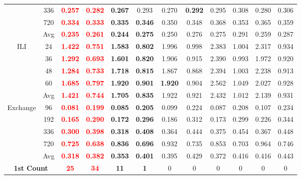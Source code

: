 \begin{table}[!htbp]
\begin{tabular}{c|c|cc|cc|cc|cc|cc}
& 336 & \textbf{\textcolor{red}{0.257}} & \textbf{\textcolor{red}{0.282}} & \textbf{0.267} & 0.293 & 0.270 & \textbf{0.292} & 0.295 & 0.308 & 0.280 & 0.306 \\
& 720 & \textbf{\textcolor{red}{0.334}} & \textbf{\textcolor{red}{0.333}} & \textbf{0.335} & \textbf{0.346} & 0.350 & 0.348 & 0.368 & 0.353 & 0.365 & 0.359 \\
& Avg & \textbf{\textcolor{red}{0.235}} & \textbf{\textcolor{red}{0.261}} & \textbf{0.244} & \textbf{0.275} & 0.250 & 0.276 & 0.275 & 0.291 & 0.259 & 0.287 \\
\midrule
\multirow{5}{*}{ILI}
& 24 & \textbf{\textcolor{red}{1.422}} & \textbf{\textcolor{red}{0.751}} & \textbf{1.583} & \textbf{0.802} & 1.996 & 0.998 & 2.383 & 1.004 & 2.317 & 0.934 \\
& 36 & \textbf{\textcolor{red}{1.292}} & \textbf{\textcolor{red}{0.693}} & \textbf{1.601} & \textbf{0.820} & 1.906 & 0.915 & 2.390 & 0.993 & 1.972 & 0.920 \\
& 48 & \textbf{\textcolor{red}{1.284}} & \textbf{\textcolor{red}{0.733}} & \textbf{1.718} & \textbf{0.815} & 1.867 & 0.868 & 2.394 & 1.003 & 2.238 & 0.913 \\
& 60 & \textbf{\textcolor{red}{1.685}} & \textbf{\textcolor{red}{0.797}} & \textbf{1.920} & \textbf{0.901} & \textbf{1.920} & 0.904 & 2.562 & 1.049 & 2.027 & 0.928 \\
& Avg & \textbf{\textcolor{red}{1.421}} & \textbf{\textcolor{red}{0.744}} & \textbf{1.705} & \textbf{0.835} & 1.922 & 0.921 & 2.432 & 1.012 & 2.139 & 0.931 \\
\midrule
\multirow{5}{*}{Exchange}
& 96 & \textbf{\textcolor{red}{0.081}} & \textbf{\textcolor{red}{0.199}} & \textbf{0.085} & \textbf{0.205} & 0.099 & 0.224 & 0.087 & 0.208 & 0.107 & 0.234 \\
& 192 & \textbf{\textcolor{red}{0.165}} & \textbf{\textcolor{red}{0.290}} & \textbf{0.172} & \textbf{0.296} & 0.186 & 0.312 & 0.173 & 0.299 & 0.226 & 0.344 \\
& 336 & \textbf{\textcolor{red}{0.300}} & \textbf{\textcolor{red}{0.398}} & \textbf{0.318} & \textbf{0.408} & 0.364 & 0.444 & 0.375 & 0.454 & 0.367 & 0.448 \\
& 720 & \textbf{\textcolor{red}{0.725}} & \textbf{\textcolor{red}{0.638}} & \textbf{0.836} & \textbf{0.696} & 0.932 & 0.735 & 0.853 & 0.703 & 0.964 & 0.746 \\
& Avg & \textbf{\textcolor{red}{0.318}} & \textbf{\textcolor{red}{0.382}} & \textbf{0.353} & \textbf{0.401} & 0.395 & 0.429 & 0.372 & 0.416 & 0.416 & 0.443 \\
\midrule
\multicolumn{2}{c|}{\textbf{1st Count}} & \textbf{\textcolor{red}{25}} & \textbf{\textcolor{red}{34}} & \textbf{11} & \textbf{1} & 0 & 0 & 0 & 0 & 0 & 0 \\
\bottomrule
\end{tabular}
\end{table}

